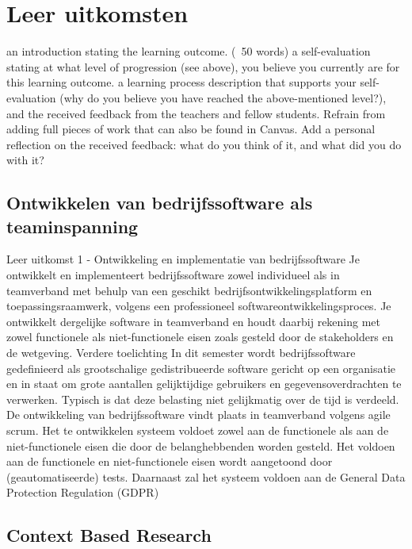 \chapter{Leer uitkomsten}
\label{ch:learning_outcomes}


an introduction stating the learning outcome. (~50 words)
a self-evaluation stating at what level of progression (see above), you believe you currently are for this learning outcome.
a learning process description that supports your self-evaluation (why do you believe you have reached the above-mentioned level?), and the received feedback from the teachers and fellow students.
Refrain from adding full pieces of work that can also be found in Canvas.
Add a personal reflection on the received feedback: what do you think of it, and what did you do with it?






\section{Ontwikkelen van bedrijfssoftware als teaminspanning}\label{sec:ontwikkelen-van-bedrijfssoftware-als-teaminspanning}

Leer uitkomst 1 - Ontwikkeling en implementatie van bedrijfssoftware Je ontwikkelt en implementeert bedrijfssoftware
zowel
individueel als in teamverband met behulp van een geschikt bedrijfsontwikkelingsplatform en toepassingsraamwerk, volgens een professioneel softwareontwikkelingsproces.
Je ontwikkelt dergelijke software in teamverband en houdt daarbij rekening met zowel functionele als niet-functionele eisen zoals gesteld door de stakeholders en de wetgeving.
Verdere toelichting In dit semester wordt bedrijfssoftware gedefinieerd als grootschalige gedistribueerde software gericht op een organisatie en in staat om grote aantallen gelijktijdige gebruikers en gegevensoverdrachten te verwerken.
Typisch is dat deze belasting niet gelijkmatig over de tijd is verdeeld.
De ontwikkeling van bedrijfssoftware vindt plaats in teamverband volgens agile scrum.
Het te ontwikkelen systeem voldoet zowel aan de functionele als aan de niet-functionele eisen die door de belanghebbenden worden gesteld.
Het voldoen aan de functionele en niet-functionele eisen wordt aangetoond door (geautomatiseerde) tests.
Daarnaast zal het systeem voldoen aan de General Data Protection Regulation (GDPR)





\section{Context Based Research}\label{sec:context-based-research}

